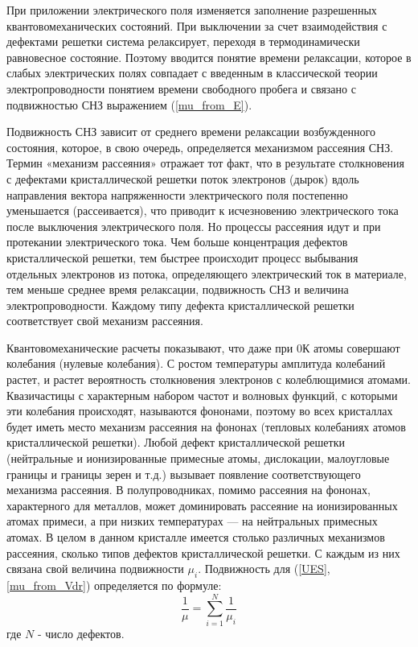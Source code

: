 При приложении электрического поля изменяется заполнение разрешенных квантовомеханических состояний. При выключении за счет взаимодействия с дефектами решетки система релаксирует, переходя в термодинамически равновесное состояние. Поэтому вводится понятие времени релаксации, которое в слабых электрических полях совпадает с введенным в классической теории электропроводности понятием времени свободного пробега и связано с подвижностью СНЗ выражением (\ref{mu_from_E}).

Подвижность СНЗ зависит от среднего времени релаксации возбужденного состояния, которое, в свою очередь, определяется механизмом рассеяния СНЗ. Термин «механизм рассеяния» отражает тот факт, что в результате столкновения с дефектами кристаллической решетки поток электронов (дырок) вдоль направления вектора напряженности электрического поля постепенно уменьшается (рассеивается), что приводит к исчезновению электрического тока после выключения электрического поля. Но процессы рассеяния идут и при протекании электрического тока. Чем больше концентрация дефектов кристаллической решетки, тем быстрее происходит процесс выбывания отдельных электронов из потока, определяющего электрический ток в материале, тем меньше среднее время релаксации, подвижность СНЗ и величина электропроводности. Каждому типу дефекта кристаллической решетки соответствует свой механизм рассеяния.

Квантовомеханические расчеты показывают, что даже при 0\textdegree К атомы совершают колебания (нулевые колебания). С ростом температуры амплитуда колебаний растет, и растет вероятность столкновения электронов с колеблющимися атомами. Квазичастицы с характерным набором частот и волновых функций, с которыми эти колебания происходят, называются фононами, поэтому во всех кристаллах будет иметь место механизм рассеяния на фононах (тепловых колебаниях атомов кристаллической решетки). Любой дефект кристаллической решетки (нейтральные и ионизированные примесные атомы, дислокации, малоугловые границы и границы зерен и т.д.) вызывает появление соответствующего механизма рассеяния. В полупроводниках, помимо рассеяния на фононах, характерного для металлов, может доминировать рассеяние на ионизированных атомах примеси, а при низких температурах — на нейтральных примесных атомах. В целом в данном кристалле имеется столько различных механизмов рассеяния, сколько типов дефектов кристаллической решетки. С каждым из них связана свой величина подвижности $\mu_{i}$. Подвижность для (\ref{UES}, \ref{mu_from_Vdr}) определяется по формуле:
\begin{equation}
\frac{1}{\mu} = \sum\limits_{i = 1}^{N}{\frac{1}{\mu_{i}}}
\end{equation}
где $N$ - число дефектов.

